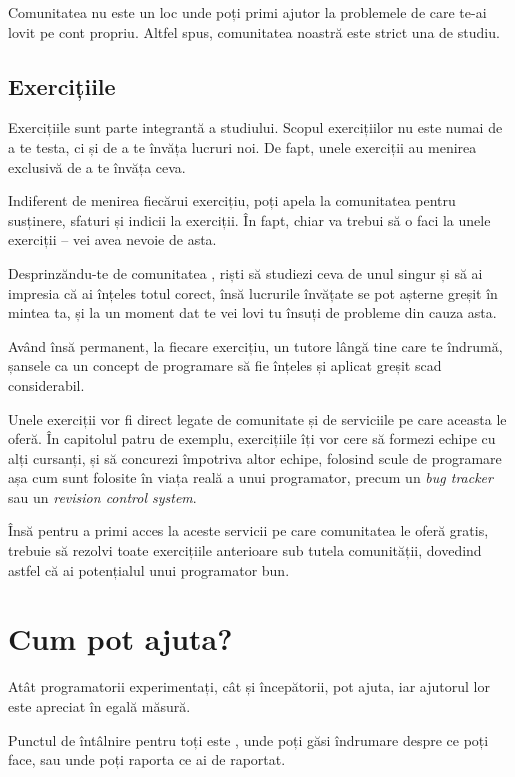 Comunitatea {\phpro} nu este un loc unde poți primi ajutor la
problemele de care te-ai lovit pe cont propriu. Altfel spus, comunitatea
noastră este strict una de studiu.

{}
\subsection*{Exercițiile}

Exercițiile sunt parte integrantă a studiului. Scopul exercițiilor nu
este numai de a te testa, ci și de a te învăța lucruri noi. De fapt,
unele exerciții au menirea exclusivă de a te învăța ceva.

Indiferent de menirea fiecărui exercițiu, poți apela la comunitatea
{\phpro} pentru susținere, sfaturi și indicii la exerciții. În fapt,
chiar va trebui să o faci la unele exerciții -- vei avea nevoie de asta.

Desprinzăndu-te de comunitatea \phpro, riști să studiezi ceva de unul
singur și să ai impresia că ai înțeles totul corect, însă lucrurile învățate
se pot așterne greșit în mintea ta, și la un moment dat te vei lovi
tu însuți de probleme din cauza asta.

Având însă permanent, la fiecare exercițiu, un tutore lângă tine care te
îndrumă, șansele ca un concept de programare să fie înțeles și aplicat
greșit scad considerabil.

Unele exerciții vor fi direct legate de comunitate și de serviciile pe care
aceasta le oferă. În capitolul patru de exemplu, exercițiile îți vor 
cere să formezi echipe cu alți cursanți, și să concurezi împotriva altor echipe, folosind
scule de programare așa cum sunt folosite în viața reală a unui programator,
precum un \textsl{bug tracker} sau un \textsl{revision control system}.

Însă pentru a primi acces la aceste servicii pe care comunitatea
{\phpro} le oferă gratis, trebuie să rezolvi toate exercițiile anterioare
sub tutela comunității, dovedind astfel că ai potențialul unui
programator bun.

{}
\section*{Cum pot ajuta?}
Atât programatorii experimentați, cât și începătorii, pot ajuta,
iar ajutorul lor este apreciat în egală măsură.

Punctul de întâlnire pentru toți este \phpro, unde poți
găsi îndrumare despre ce poți face, sau unde poți raporta
ce ai de raportat.

